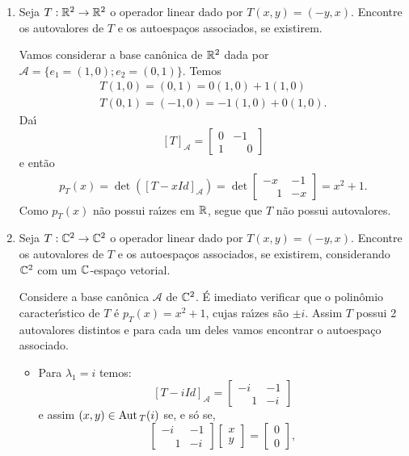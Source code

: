 \begin{exemplo}
	\begin{enumerate}
		\item Seja $T : \mathbb{R}^2 \to \mathbb{R}^2$ o operador linear dado por $T(x,y) = (-y,x)$. Encontre os autovalores de $T$ e os autoespa\c{c}os associados, se existirem.
		\begin{solucao}
			Vamos considerar a base can\^onica de $\mathbb{R}^2$ dada por $\mathcal{A} = \{e_1 = (1,0); e_2 = (0,1)\}$. Temos
			\begin{align}
				T(1,0) = (0,1) = 0(1,0) + 1(1,0)\\
				T(0,1) = (-1,0) = -1(1,0) + 0(1,0).
			\end{align}
			Da{\'\i}
			\[
				[T]_\mathcal{A} = \begin{bmatrix}0 & -1\\ 1 & \phantom{-}0\end{bmatrix}
			\]
			e ent\~ao
			\begin{align*}
				p_T(x) = \det([T - xId]_\mathcal{A}) = \det\begin{bmatrix} -x & -1\\\phantom{-}1 & -x\end{bmatrix} = x^2 + 1.
			\end{align*}
			Como $p_T(x)$ n\~ao possui ra{\'\i}zes em $\mathbb{R}$, segue que $T$ n\~ao possui autovalores.
		\end{solucao}
		\item Seja $T : \mathbb{C}^2 \to \mathbb{C}^2$ o operador linear dado por $T(x,y) = (-y,x)$. Encontre os autovalores de $T$ e os autoespa\c{c}os associados, se existirem, considerando $\mathbb{C}^2$ com um $\mathbb{C}$-espa\c{c}o vetorial.
		\begin{solucao}
			Considere a base can\^onica $\mathcal{A}$ de $\mathbb{C}^2$. \'E imediato verificar que o polin\^omio caracter{\'\i}stico de $T$ \'e $p_T(x) = x^2 + 1$, cujas ra{\'\i}zes s\~ao $\pm i$. Assim $T$ possui 2 autovalores distintos e para cada um deles vamos encontrar o autoespa\c{c}o associado.
			\begin{itemize}
				\item Para $\lambda_1 = i$ temos:
				\[
					[T - iId]_\mathcal{A} = \begin{bmatrix} -i & -1\\\phantom{-}1 & -i\end{bmatrix}
				\]
				e assim $(x,y) \in {\rm Aut\,}_T(i)$ se, e s\'o se,
				\[
					\begin{bmatrix} -i & -1\\\phantom{-}1 & -i\end{bmatrix} \begin{bmatrix} x\\y\end{bmatrix}	 = \begin{bmatrix} 0\\0\end{bmatrix},
\]
\end{itemize}
\end{solucao}
\end{enumerate}
\end{exemplo}
